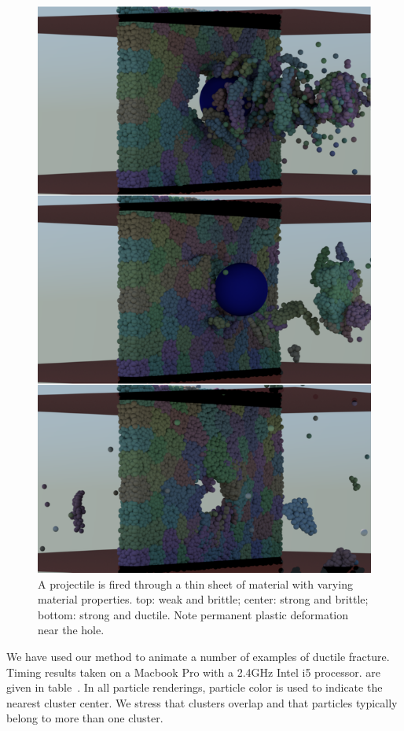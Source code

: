 \documentclass[review]{acmsiggraph}
\begin{document}
\begin{figure}
\includegraphics[width=\linewidth]{Figures/plateComparison}
\caption{A projectile is fired through a thin sheet of material with varying material properties. top: weak and brittle; center: strong and brittle; bottom: strong and ductile.  Note permanent plastic deformation near the hole.  }
\label{fig:projectile}
\end{figure}

We have used our method to animate a number of examples of ductile fracture.  Timing results
taken on a Macbook Pro with a 2.4GHz Intel i5 processor.
are given in table~.
In all particle renderings, particle color is used to indicate the nearest cluster center.  
We stress that clusters overlap and that particles typically belong to more than one cluster.
\end{document}
